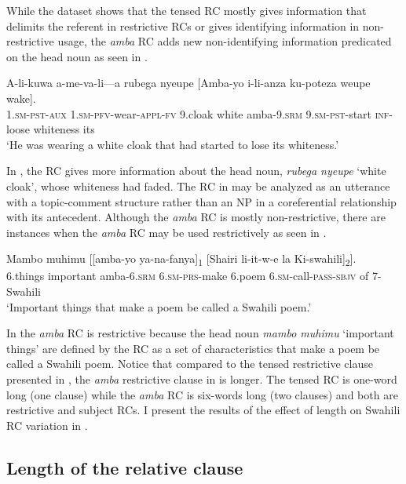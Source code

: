 \documentclass[output=paper,colorlinks,citecolor=brown]{langscibook}
\begin{document}
While the dataset shows that the tensed RC mostly gives information that delimits the referent in restrictive RCs or gives identifying information in non-restrictive usage, the \textit{amba} RC adds new non-identifying information predicated on the head noun as seen in .

\ea%
    \label{ex:mwamzandi:17}
    \gll    A-li-kuwa a-me-va-li—a rubega nyeupe [Amba-yo i-li-anza ku-poteza weupe wake].\\
            \textsc{1.sm-pst-aux} \textsc{1.sm-pfv-}wear\textsc{-appl-fv} 9.cloak white amba\textsc{-9.srm} \textsc{9.sm-pst-}start \textsc{inf-}loose whiteness its\\
    \glt    ‘He was wearing a white cloak that had started to lose its whiteness.’
\z

In , the RC gives more information about the head noun, \textit{rubega nyeupe} ‘white cloak’, whose whiteness had faded. The RC in  may be analyzed as an utterance with a topic-comment structure rather than an NP in a coreferential relationship with its antecedent. Although the \textit{amba} RC is mostly non-restrictive, there are instances when the \textit{amba} RC may be used restrictively as seen in .

\ea%
    \label{ex:mwamzandi:18}
    \gll    Mambo muhimu [[amba-yo  ya-na-fanya]\textsubscript{1} [Shairi li-it-w-e la Ki-swahili]\textsubscript{2}].\\
            6.things important amba\textsc{-6.srm} \textsc{6.sm-prs-}make 6.poem  \textsc{6.sm-}call\textsc{-pass-sbjv} of 7-Swahili\\
    \glt    ‘Important things that make a poem be called a Swahili poem.’
\z

In  the \textit{amba} RC is restrictive because the head noun \textit{mambo muhimu} ‘important things’ are defined by the RC as a set of characteristics that make a poem be called a Swahili poem. Notice that compared to the tensed restrictive clause presented in , the \textit{amba} restrictive clause in  is longer. The tensed RC is one-word long (one clause) while the \textit{amba} RC is six-words long (two clauses) and both are restrictive and subject RCs. I present the results of the effect of length on Swahili RC variation in .

\subsection{Length of the relative clause}\label{sec:mwamzandi:4.2}
\end{document}
